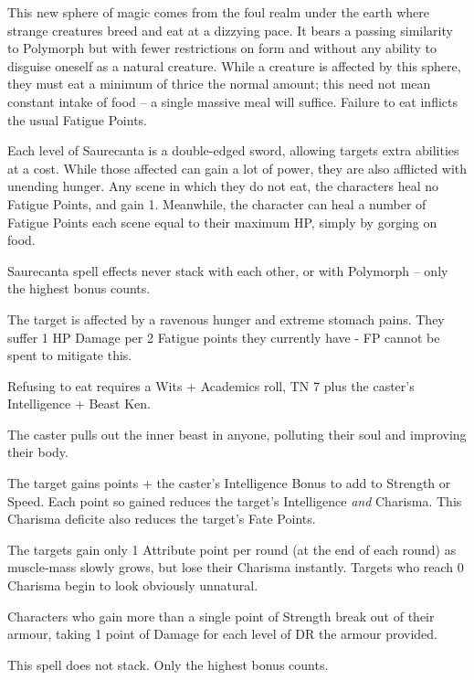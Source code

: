 \begin{multicols}{2}

This new sphere of magic comes from the foul realm under the earth where strange creatures breed and eat at a dizzying pace.
It bears a passing similarity to Polymorph but with fewer restrictions on form and without any ability to disguise oneself as a natural creature.
While a creature is affected by this sphere, they must eat a minimum of thrice the normal amount; this need not mean constant intake of food -- a single massive meal will suffice.
Failure to eat inflicts the usual Fatigue Points.

Each level of Saurecanta is a double-edged sword, allowing targets extra abilities at a cost.
While those affected can gain a lot of power, they are also afflicted with unending hunger.
Any scene in which they do not eat, the characters heal no Fatigue Points, and gain 1.
Meanwhile, the character can heal a number of Fatigue Points each scene equal to their maximum HP, simply by gorging on food.

Saurecanta spell effects never stack with each other, or with Polymorph -- only the highest bonus counts.

\spelllevel \label{saurecantaone}
The target is affected by a ravenous hunger and extreme stomach pains.  They suffer 1 HP Damage per 2 Fatigue points they currently have - FP cannot be spent to mitigate this.

Refusing to eat requires a Wits + Academics roll, TN 7 plus the caster's Intelligence + Beast Ken.

\spelllevel
{}
The caster pulls out the inner beast in anyone, polluting their soul and improving their body.

The target gains  points + the caster's Intelligence Bonus to add to Strength or Speed.
Each point so gained reduces the target's Intelligence \emph{and} Charisma.
This Charisma deficite also reduces the target's Fate Points.

The targets gain only 1 Attribute point per round (at the end of each round) as muscle-mass slowly grows, but lose their Charisma instantly.
Targets who reach 0 Charisma begin to look obviously unnatural.

Characters who gain more than a single point of Strength break out of their armour, taking 1 point of Damage for each level of DR the armour provided.

This spell does not stack.
Only the highest bonus counts.


\end{multicols}
